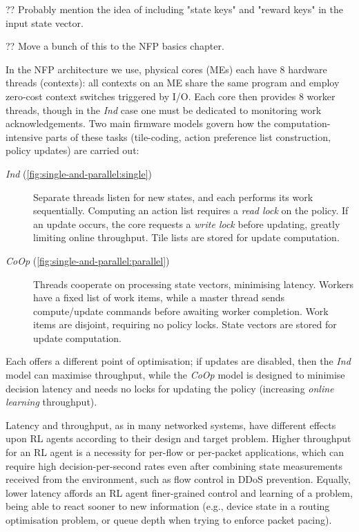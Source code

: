 \documentclass[sigconf,natbib=false]{acmart}
\newcommand{\Coopfw}{\emph{CoOp}}
\newcommand{\coopfw}{\Coopfw}
\newcommand{\Indfw}{\emph{Ind}}
\newcommand{\indfw}{\Indfw}
\begin{document}
?? Probably mention the idea of including "state keys" and "reward keys" in the input state vector.

?? Move a bunch of this to the NFP basics chapter.

In the NFP architecture we use, physical cores (MEs) each have 8 hardware threads (contexts): all contexts on an ME share the same program and employ zero-cost context switches triggered by I/O.
Each core then provides 8 worker threads, though in the \indfw{} case one must be dedicated to monitoring work acknowledgements.
Two main firmware models govern how the computation-intensive parts of these tasks (tile-coding, action preference list construction, policy updates) are carried out:
\begin{description}
	\item[\Indfw{} (\cref{fig:single-and-parallel:single})] Separate threads listen for new states, and each performs its work sequentially. Computing an action list requires a \emph{read lock} on the policy. If an update occurs, the core requests a \emph{write lock} before updating, greatly limiting online throughput. Tile lists are stored for update computation.
	\item[\Coopfw{} (\cref{fig:single-and-parallel:parallel})] Threads cooperate on processing state vectors, minimising latency. Workers have a fixed list of work items, while a master thread sends compute/update commands before awaiting worker completion. Work items are disjoint, requiring no policy locks. State vectors are stored for update computation.
\end{description}
Each offers a different point of optimisation; if updates are disabled, then the \emph{\indfw{}} model can maximise throughput, while the \emph{\coopfw{}} model is designed to minimise decision latency and needs no locks for updating the policy (increasing \emph{online learning} throughput).

Latency and throughput, as in many networked systems, have different effects upon RL agents according to their design and target problem.
Higher throughput for an RL agent is a necessity for per-flow or per-packet applications, which can require high decision-per-second rates even after combining state measurements received from the environment, such as flow control in DDoS prevention.
Equally, lower latency affords an RL agent finer-grained control and learning of a problem, being able to react sooner to new information (e.g., device state in a routing optimisation problem, or queue depth when trying to enforce packet pacing).
\end{document}
